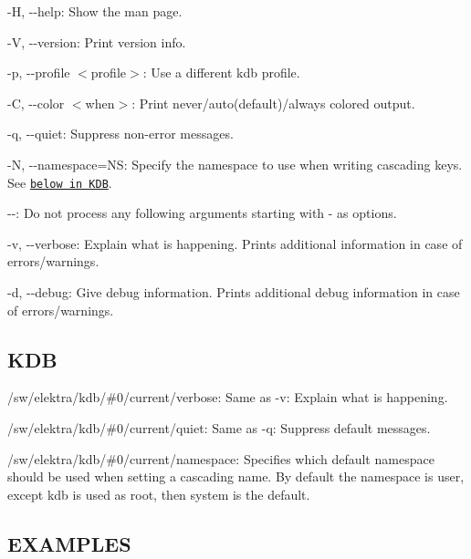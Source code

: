 \begin{DoxyItemize}
\item {\ttfamily -\/H}, {\ttfamily -\/-\/help}\+: Show the man page.
\item {\ttfamily -\/V}, {\ttfamily -\/-\/version}\+: Print version info.
\item {\ttfamily -\/p}, {\ttfamily -\/-\/profile $<$profile$>$}\+: Use a different kdb profile.
\item {\ttfamily -\/C}, {\ttfamily -\/-\/color $<$when$>$}\+: Print never/auto(default)/always colored output.
\item {\ttfamily -\/q}, {\ttfamily -\/-\/quiet}\+: Suppress non-\/error messages.
\item {\ttfamily -\/N}, {\ttfamily -\/-\/namespace=NS}\+: Specify the namespace to use when writing cascading keys. See \href{#KDB}{\tt below in K\+DB}.
\item {\ttfamily -\/-\/}\+: Do not process any following arguments starting with {\ttfamily -\/} as options.
\item {\ttfamily -\/v}, {\ttfamily -\/-\/verbose}\+: Explain what is happening. Prints additional information in case of errors/warnings.
\item {\ttfamily -\/d}, {\ttfamily -\/-\/debug}\+: Give debug information. Prints additional debug information in case of errors/warnings.
\end{DoxyItemize}

\subsection*{K\+DB}


\begin{DoxyItemize}
\item {\ttfamily /sw/elektra/kdb/\#0/current/verbose}\+: Same as {\ttfamily -\/v}\+: Explain what is happening.
\item {\ttfamily /sw/elektra/kdb/\#0/current/quiet}\+: Same as {\ttfamily -\/q}\+: Suppress default messages.
\item {\ttfamily /sw/elektra/kdb/\#0/current/namespace}\+: Specifies which default namespace should be used when setting a cascading name. By default the namespace is user, except {\ttfamily kdb} is used as root, then {\ttfamily system} is the default.
\end{DoxyItemize}

\subsection*{E\+X\+A\+M\+P\+L\+ES}

